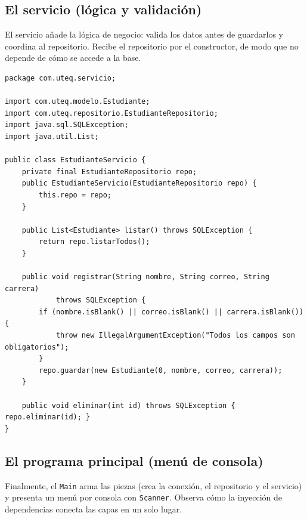 \documentclass[11pt]{article}
\begin{document}
\subsection{El servicio (lógica y validación)}
El servicio añade la lógica de negocio: valida los datos antes de guardarlos y coordina al repositorio. Recibe el repositorio por el constructor, de modo que no depende de cómo se accede a la base.

\begin{cajacodigo}
\begin{lstlisting}[style=java]
package com.uteq.servicio;

import com.uteq.modelo.Estudiante;
import com.uteq.repositorio.EstudianteRepositorio;
import java.sql.SQLException;
import java.util.List;

public class EstudianteServicio {
    private final EstudianteRepositorio repo;
    public EstudianteServicio(EstudianteRepositorio repo) {
        this.repo = repo;
    }

    public List<Estudiante> listar() throws SQLException {
        return repo.listarTodos();
    }

    public void registrar(String nombre, String correo, String carrera)
            throws SQLException {
        if (nombre.isBlank() || correo.isBlank() || carrera.isBlank()) {
            throw new IllegalArgumentException("Todos los campos son obligatorios");
        }
        repo.guardar(new Estudiante(0, nombre, correo, carrera));
    }

    public void eliminar(int id) throws SQLException { repo.eliminar(id); }
}
\end{lstlisting}
\end{cajacodigo}
\vspace{2pt}
\subsection{El programa principal (menú de consola)}
Finalmente, el \texttt{Main} arma las piezas (crea la conexión, el repositorio y el servicio) y presenta un menú por consola con \texttt{Scanner}. Observa cómo la inyección de dependencias conecta las capas en un solo lugar.
\end{document}
